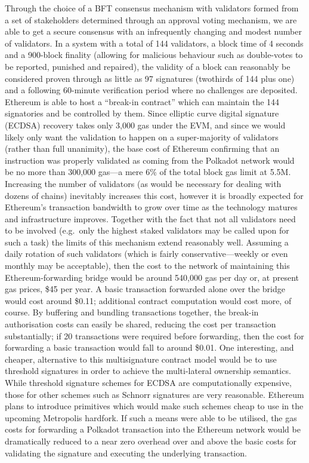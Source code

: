 Through the choice of a BFT consensus mechanism with validators formed
from a set of stakeholders determined through an approval voting
mechanism, we are able to get a secure consensus with an infrequently
changing and modest number of validators. In a system with a total of
144 validators, a block time of 4 seconds and a 900-block finality
(allowing for malicious behaviour such as double-votes to be reported,
punished and repaired), the validity of a block can reasonably be
considered proven through as little as 97 signatures (twothirds of 144
plus one) and a following 60-minute verification period where no
challenges are deposited. Ethereum is able to host a ``break-in
contract'' which can maintain the 144 signatories and be controlled by
them. Since elliptic curve digital signature (ECDSA) recovery takes only
3,000 gas under the EVM, and since we would likely only want the
validation to happen on a super-majority of validators (rather than full
unanimity), the base cost of Ethereum confirming that an instruction was
properly validated as coming from the Polkadot network would be no more
than 300,000 gas---a mere 6\% of the total block gas limit at 5.5M.
Increasing the number of validators (as would be necessary for dealing
with dozens of chains) inevitably increases this cost, however it is
broadly expected for Ethereum's transaction bandwidth to grow over time
as the technology matures and infrastructure improves. Together with the
fact that not all validators need to be involved (e.g.~only the highest
staked validators may be called upon for such a task) the limits of this
mechanism extend reasonably well. Assuming a daily rotation of such
validators (which is fairly conservative---weekly or even monthly may be
acceptable), then the cost to the network of maintaining this
Ethereum-forwarding bridge would be around 540,000 gas per day or, at
present gas prices, \$45 per year. A basic transaction forwarded alone
over the bridge would cost around \$0.11; additional contract
computation would cost more, of course. By buffering and bundling
transactions together, the break-in authorisation costs can easily be
shared, reducing the cost per transaction substantially; if 20
transactions were required before forwarding, then the cost for
forwarding a basic transaction would fall to around \$0.01. One
interesting, and cheaper, alternative to this multisignature contract
model would be to use threshold signatures in order to achieve the
multi-lateral ownership semantics. While threshold signature schemes for
ECDSA are computationally expensive, those for other schemes such as
Schnorr signatures are very reasonable. Ethereum plans to introduce
primitives which would make such schemes cheap to use in the upcoming
Metropolis hardfork. If such a means were able to be utilised, the gas
costs for forwarding a Polkadot transaction into the Ethereum network
would be dramatically reduced to a near zero overhead over and above the
basic costs for validating the signature and executing the underlying
transaction.

